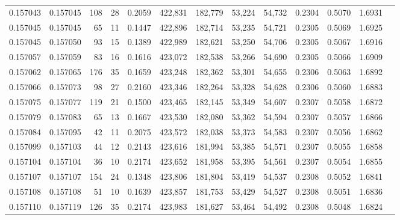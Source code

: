 \begin{tabular}{rrrrrrrrrrrrr}
0.157043 & 0.157045 &   108 &  28 &                                     0.2059 & 422,831 & 182,779 &  53,224 &  54,732 & 0.2304 & 0.5070 & 1.6931 \\
0.157045 & 0.157045 &    65 &  11 &                                     0.1447 & 422,896 & 182,714 &  53,235 &  54,721 & 0.2305 & 0.5069 & 1.6925 \\
0.157045 & 0.157050 &    93 &  15 &                                     0.1389 & 422,989 & 182,621 &  53,250 &  54,706 & 0.2305 & 0.5067 & 1.6916 \\
0.157057 & 0.157059 &    83 &  16 &                                     0.1616 & 423,072 & 182,538 &  53,266 &  54,690 & 0.2305 & 0.5066 & 1.6909 \\
0.157062 & 0.157065 &   176 &  35 &                                     0.1659 & 423,248 & 182,362 &  53,301 &  54,655 & 0.2306 & 0.5063 & 1.6892 \\
0.157066 & 0.157073 &    98 &  27 &                                     0.2160 & 423,346 & 182,264 &  53,328 &  54,628 & 0.2306 & 0.5060 & 1.6883 \\
0.157075 & 0.157077 &   119 &  21 &                                     0.1500 & 423,465 & 182,145 &  53,349 &  54,607 & 0.2307 & 0.5058 & 1.6872 \\
0.157079 & 0.157083 &    65 &  13 &                                     0.1667 & 423,530 & 182,080 &  53,362 &  54,594 & 0.2307 & 0.5057 & 1.6866 \\
0.157084 & 0.157095 &    42 &  11 &                                     0.2075 & 423,572 & 182,038 &  53,373 &  54,583 & 0.2307 & 0.5056 & 1.6862 \\
0.157099 & 0.157103 &    44 &  12 &                                     0.2143 & 423,616 & 181,994 &  53,385 &  54,571 & 0.2307 & 0.5055 & 1.6858 \\
0.157104 & 0.157104 &    36 &  10 &                                     0.2174 & 423,652 & 181,958 &  53,395 &  54,561 & 0.2307 & 0.5054 & 1.6855 \\
0.157107 & 0.157107 &   154 &  24 &                                     0.1348 & 423,806 & 181,804 &  53,419 &  54,537 & 0.2308 & 0.5052 & 1.6841 \\
0.157108 & 0.157108 &    51 &  10 &                                     0.1639 & 423,857 & 181,753 &  53,429 &  54,527 & 0.2308 & 0.5051 & 1.6836 \\
0.157110 & 0.157119 &   126 &  35 &                                     0.2174 & 423,983 & 181,627 &  53,464 &  54,492 & 0.2308 & 0.5048 & 1.6824 \\

\end{tabular}
